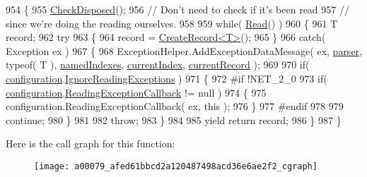\begin{DoxyCode}
954         \{
955             \hyperlink{a00079_a6fa45a46ed1322dc1872ca2321b5edbc}{CheckDisposed}();
956             \textcolor{comment}{// Don't need to check if it's been read}
957             \textcolor{comment}{// since we're doing the reading ourselves.}
958 
959             \textcolor{keywordflow}{while}( \hyperlink{a00079_af1f0d4d722e93df9da30fe60b89ff2d6}{Read}() )
960             \{
961                 T record;
962                 \textcolor{keywordflow}{try}
963                 \{
964                     record = \hyperlink{a00079_aadbd9b18761654925be4bed3b906faa1}{CreateRecord<T>}();
965                 \}
966                 \textcolor{keywordflow}{catch}( Exception ex )
967                 \{
968                     ExceptionHelper.AddExceptionDataMessage( ex, \hyperlink{a00079_aaf2ee64c7a157027aea69bfae1fa9edc}{parser}, typeof( T ), 
      \hyperlink{a00079_a3114f49bd2b3c4966f4b15a310747aeb}{namedIndexes}, \hyperlink{a00079_a56e974bc7e2242912e956393e831e166}{currentIndex}, \hyperlink{a00079_ab2bfef15784add66e441c9d3a0d73751}{currentRecord} );
969 
970                     \textcolor{keywordflow}{if}( \hyperlink{a00079_a695622911e45cbac8d67dcbd9a3e2967}{configuration}.\hyperlink{a00065_a8645dbd4fe2a9c443910695a93b1027f}{IgnoreReadingExceptions} )
971                     \{
972 \textcolor{preprocessor}{#if !NET\_2\_0
}
973 \textcolor{preprocessor}{}                        \textcolor{keywordflow}{if}( \hyperlink{a00079_a695622911e45cbac8d67dcbd9a3e2967}{configuration}.\hyperlink{a00065_ae7257970a1b5bfb9f2ddfdc61a70fe34}{ReadingExceptionCallback} != 
      null )
974                         \{
975                             configuration.ReadingExceptionCallback( ex, this );
976                         \}
977 \textcolor{preprocessor}{#endif
}
978 \textcolor{preprocessor}{}
979                         \textcolor{keywordflow}{continue};
980                     \}
981 
982                     \textcolor{keywordflow}{throw};
983                 \}
984 
985                 yield \textcolor{keywordflow}{return} record;
986             \}
987         \}
\end{DoxyCode}


Here is the call graph for this function\-:
\nopagebreak
\begin{figure}[H]
\begin{center}
\leavevmode
\texttt{[image: a00079\_afed61bbcd2a120487498acd36e6ae2f2\_cgraph]}
\end{center}
\end{figure}


